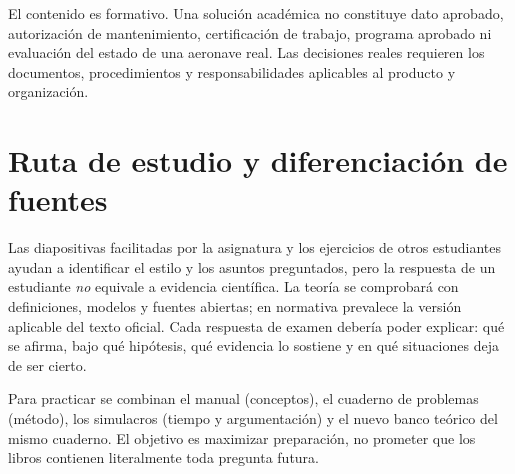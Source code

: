 El contenido es formativo. Una solución académica no constituye dato aprobado, autorización de mantenimiento, certificación de trabajo, programa aprobado ni evaluación del estado de una aeronave real. Las decisiones reales requieren los documentos, procedimientos y responsabilidades aplicables al producto y organización.

\section*{Ruta de estudio y diferenciación de fuentes}
Las diapositivas facilitadas por la asignatura y los ejercicios de otros estudiantes ayudan a identificar el estilo y los asuntos preguntados, pero la respuesta de un estudiante \emph{no} equivale a evidencia científica. La teoría se comprobará con definiciones, modelos y fuentes abiertas; en normativa prevalece la versión aplicable del texto oficial. Cada respuesta de examen debería poder explicar: qué se afirma, bajo qué hipótesis, qué evidencia lo sostiene y en qué situaciones deja de ser cierto.

Para practicar se combinan el manual (conceptos), el cuaderno de problemas (método), los simulacros (tiempo y argumentación) y el nuevo banco teórico del mismo cuaderno. El objetivo es maximizar preparación, no prometer que los libros contienen literalmente toda pregunta futura.


